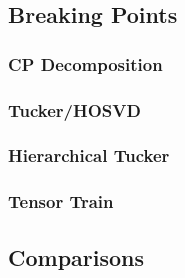 \subsection{Breaking Points}

\subsubsection{CP Decomposition}

\subsubsection{Tucker/HOSVD}

\subsubsection{Hierarchical Tucker}

\subsubsection{Tensor Train}

\subsection{Comparisons}

